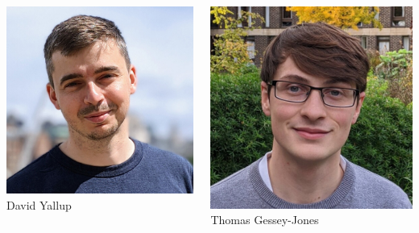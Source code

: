 \documentclass[aspectratio=169]{beamer}
\begin{document}
\begin{frame}
\begin{columns}
        \includegraphics[width=\textwidth]{people/david_yallup}
\tiny{David Yallup}

        \includegraphics[width=\textwidth]{people/thomas_gessey-jones}
\tiny{Thomas Gessey-Jones}


\end{columns}
\end{frame}
\end{document}
